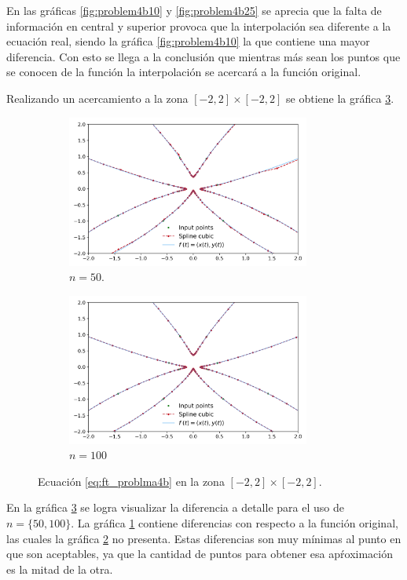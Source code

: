 En las gráficas \ref{fig:problem4b10} y \ref{fig:problem4b25} se aprecia que la falta de información en central y superior provoca que la interpolación sea diferente a la ecuación real, siendo la gráfica \ref{fig:problem4b10} la que contiene una mayor diferencia. Con esto se llega a la conclusión que mientras más sean los puntos que se conocen de la función la interpolación se acercará a la función original.

Realizando un acercamiento a la zona $[-2,2]\times[-2,2]$ se obtiene la gráfica \ref{fig:problema4b_zoom}.

\begin{figure}[H]
	\centering
	\begin{subfigure}[b]{8cm}
		\includegraphics[width=8cm]{Graphics/problema04b_zoom50.png}
		\caption{$n=50$.}
		\label{fig:problema4b_zoom50}
	\end{subfigure}
	\begin{subfigure}[b]{8cm}
		\includegraphics[width=8cm]{Graphics/problema04b_zoom100.png}
		\caption{$n=100$}
		\label{fig:problema4b_zoom100}
	\end{subfigure}
	\caption{Ecuación \ref{eq:ft_problma4b} en la zona $[-2,2]\times[-2,2]$.}
	\label{fig:problema4b_zoom}
\end{figure}

En la gráfica \ref{fig:problema4b_zoom} se logra visualizar la diferencia a detalle para el uso de $n=\{50,100\}$. La gráfica \ref{fig:problema4b_zoom50} contiene diferencias con respecto a la función original, las cuales la gráfica \ref{fig:problema4b_zoom100} no presenta. Estas diferencias son muy mínimas al punto en que son aceptables, ya que la cantidad de puntos para obtener esa apŕoximación es la mitad de la otra.
\pagebreak
